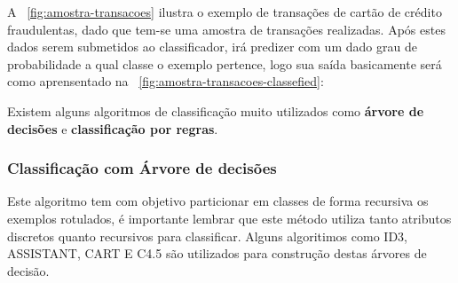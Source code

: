 A ~\autoref{fig:amostra-transacoes} ilustra o exemplo de transações de cartão de crédito fraudulentas, dado que tem-se uma 
amostra de transações realizadas. Após estes dados serem submetidos ao classificador, irá predizer com um dado grau de probabilidade 
a qual classe o exemplo pertence, logo sua saída basicamente será como aprensentado na ~\autoref{fig:amostra-transacoes-classefied}:
\begin{figure}[ht!]
	\centering
\end{figure}
\begin{figure}[ht!]
	\centering
\end{figure}

Existem alguns algoritmos de classificação muito utilizados como  \textbf{árvore de decisões} e \textbf{classificação por regras}.


\subsubsection{Classificação com Árvore de decisões}
\label{subsubsec:decision-tree}
Este algoritmo tem com objetivo particionar em classes de forma recursiva os exemplos rotulados, é importante lembrar que este método
utiliza tanto atributos discretos quanto recursivos para classificar. Alguns algoritimos como ID3, ASSISTANT, CART E C4.5 
são utilizados para construção destas árvores de decisão.

